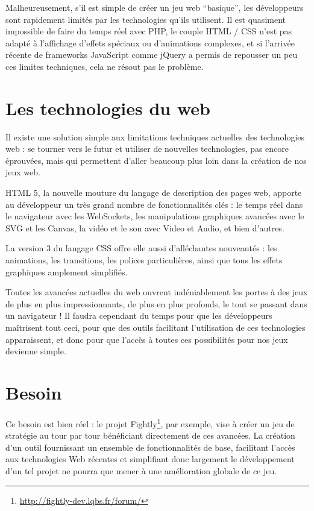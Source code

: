 \documentclass[a4paper,10pt]{report}
\begin{document}
      Malheureusement, s’il est simple de créer un jeu web “basique”, les développeurs sont rapidement limités par les technologies qu’ils utilisent. Il est quasiment impossible de faire du temps réel avec PHP, le couple HTML / CSS n’est pas adapté à l’affichage d’effets spéciaux ou d’animations complexes, et si l’arrivée récente de frameworks JavaScript comme jQuery a permis de repousser un peu ces limites techniques, cela ne résout pas le problème.

    \section{Les technologies du web}

      Il existe une solution simple aux limitations techniques actuelles des technologies web : se tourner vers le futur et utiliser de nouvelles technologies, pas encore éprouvées, mais qui permettent d’aller beaucoup plus loin dans la création de nos jeux web.

      HTML 5, la nouvelle mouture du langage de description des pages web, apporte au développeur un très grand nombre de fonctionnalités clés : le temps réel dans le navigateur avec les WebSockets, les manipulations graphiques avancées avec le SVG et les Canvas, la vidéo et le son avec Video et Audio, et bien d’autres.

      La version 3 du langage CSS offre elle aussi d’alléchantes nouveautés : les animations, les transitions, les polices particulières, ainsi que tous les effets graphiques amplement simplifiés.

      Toutes les avancées actuelles du web ouvrent indéniablement les portes à des jeux de plus en plus impressionnants, de plus en plus profonds, le tout se passant dans un navigateur ! Il faudra cependant du temps pour que les développeurs maîtrisent tout ceci, pour que des outils facilitant l’utilisation de ces technologies apparaissent, et donc pour que l’accès à toutes ces possibilités pour nos jeux devienne simple.

    \section{Besoin}
    
      Ce besoin est bien réel : le projet Fightly\footnote{\url{http://fightly-dev.lqbs.fr/forum/}}, par exemple, vise à créer un jeu de stratégie au tour par tour bénéficiant directement de ces avancées. La création d'un outil fournissant un ensemble de fonctionnalités de base, facilitant l'accès aux technologies Web récentes et simplifiant donc largement le développement d'un tel projet ne pourra que mener à une amélioration globale de ce jeu.
\end{document}
